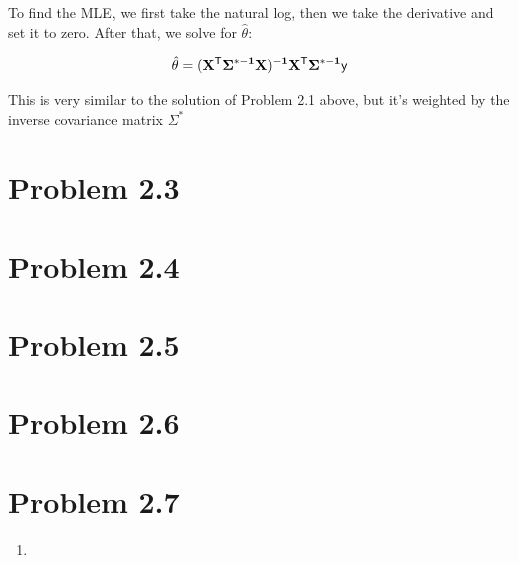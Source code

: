 \documentclass{article}
\begin{document}
To find the MLE, we first take the natural log, then we take the derivative and set it to zero. After that, we solve for $\hat{\theta}$:

\begin{align*}
  \hat{\theta} = (\bf{X}^{\sf{T}}\Sigma^{*-1}\bf{X})^{-1}\bf{X}^{\sf{T}}\Sigma^{*-1}\bf{\sf{y}}
\end{align*}

This is very similar to the solution of Problem 2.1 above, but it's weighted by the inverse covariance matrix $\Sigma^*$

\section*{Problem 2.3}

\section*{Problem 2.4}

\section*{Problem 2.5}

\section*{Problem 2.6}

\section*{Problem 2.7}
\begin{enumerate}[label=(\alph*)]
  \item 
\end{enumerate}
\end{document}
